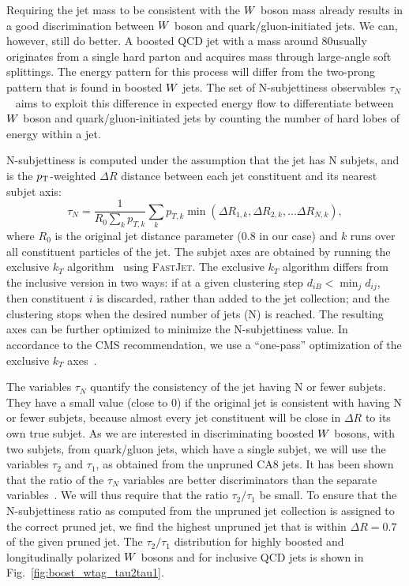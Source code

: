 Requiring the jet mass to be consistent with the $W$ boson mass already results in a good
discrimination between $W$ boson and quark/gluon-initiated jets. We can, however, still do better.
A boosted QCD jet with a mass around 80\GeV usually originates from a single hard parton and
acquires mass through large-angle soft splittings. The energy pattern for this process will differ
from the two-prong pattern that is found in boosted $W$ jets.  
The set of N-subjettiness observables $\tau_N$~\cite{Thaler:2010tr} aims to exploit this difference
in expected energy flow to differentiate between $W$ boson and quark/gluon-initiated jets by
counting the number of hard lobes of energy within a jet.

N-subjettiness is computed under the assumption that the jet has N subjets, and is the
$p_{\mathrm{T}}$-weighted $\Delta R$ distance between each jet constituent and its nearest subjet axis:
\begin{equation}
\tau_N = \frac{1}{R_0 \sum_{k} p_{T, k}} \sum_k p_{T, k} \min (\Delta R_{1,k}, \Delta R_{2,k}, ...
\Delta R_{N,k}),
\end{equation}
where $R_0$ is the original jet distance parameter (0.8 in our case) and $k$ runs over all
constituent particles of the jet. 
The subjet axes are obtained by running the exclusive $k_T$
algorithm~\cite{Ellis:1993tq,Catani:1993hr} using \textsc{FastJet}. 
The exclusive $k_T$ algorithm differs from the inclusive version in two ways: if at a given
clustering step $d_{iB} < \min_j d_{ij}$, then constituent $i$ is discarded, rather than added to
the jet collection; and the clustering stops when the desired number of jets (N) is reached. 
The resulting axes can be further optimized to minimize the N-subjettiness value. In accordance to
the CMS recommendation, we use a “one-pass” optimization of the exclusive $k_T$
axes~\cite{nsubjettiness_fastjet}.

The variables $\tau_N$ quantify the consistency of the jet having N or fewer subjets. They have a
small value (close to 0) if the original jet is consistent with having N or fewer subjets, because
almost every jet constituent will be close in $\Delta R$ to its own true subjet. 
As we are interested in discriminating boosted $W$ bosons, with two subjets, from quark/gluon
jets, which have a single subjet, we will use the variables $\tau_2$ and $\tau_1$, as obtained
from the unpruned CA8 jets.   
It has been shown that the ratio of the $\tau_N$ variables are better discriminators than the
separate variables~\cite{Thaler:2010tr}. We will thus require that the ratio $\tau_2 / \tau_1$ be
small. 
To ensure that the N-subjettiness ratio as computed from the unpruned
jet collection is assigned to the correct pruned jet, we find the highest \pt unpruned jet that is
within $\Delta R = 0.7$ of the given pruned jet.
The $\tau_2 / \tau_1$ distribution for highly boosted and longitudinally polarized $W$
bosons and for inclusive QCD jets is shown in Fig.~\ref{fig:boost_wtag_tau2tau1}. 


